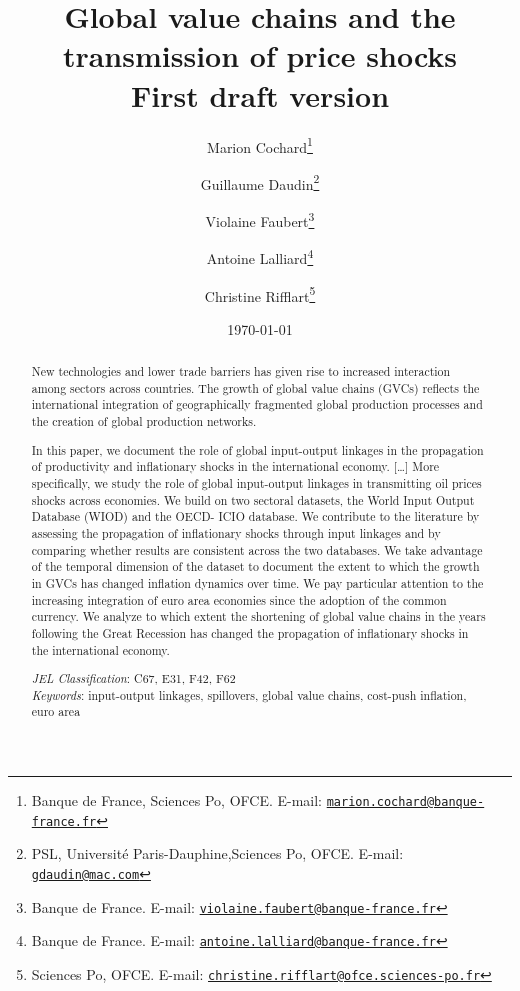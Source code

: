 \documentclass[11pt,a4paper]{article}
\newcommand{\email}[1]{\href{mailto:#1}{\nolinkurl{#1}}}
\begin{document}
\title{Global value chains and the transmission of price shocks\\
\vspace{1cm}
\normalsize{First draft version}
}
\vspace{1cm}

\date{\today}



\author{Marion Cochard\thanks{Banque de France, Sciences Po, OFCE. E-mail: \email{marion.cochard@banque-france.fr}}\and Guillaume Daudin\thanks{PSL, Université Paris-Dauphine,Sciences Po, OFCE. E-mail: \email{gdaudin@mac.com}}\and Violaine Faubert\thanks{Banque de France. E-mail: \email{violaine.faubert@banque-france.fr}} \and Antoine Lalliard\thanks{Banque de France. E-mail: \email{antoine.lalliard@banque-france.fr}} \and Christine Rifflart\thanks{Sciences Po, OFCE. E-mail: \email{christine.rifflart@ofce.sciences-po.fr}}
}



\maketitle

\begin{abstract}
{\small \noindent
New technologies and lower trade barriers has given rise to increased interaction among sectors across countries. The growth of global value chains (GVCs) reflects the international integration of geographically fragmented global production processes and the creation of global production networks.

In this paper, we document the role of global input-output linkages in the propagation of productivity and inflationary shocks in the international economy. 
[…] %
More specifically, we study the role of global input-output linkages in transmitting oil prices shocks across economies.
We build on two sectoral datasets, the World Input Output Database (WIOD) and the OECD- ICIO database. We contribute to the literature by assessing the propagation of inflationary shocks through input linkages and by comparing whether results are consistent across the two databases. We take advantage of the temporal dimension of the dataset to document the extent to which the growth in GVCs has changed inflation dynamics over time. We pay particular attention to the increasing integration of euro area economies since the adoption of the common currency. We analyze to which extent the shortening of global value chains in the years following the Great Recession has changed the propagation of inflationary shocks in the international economy. 

}

{\small \bigskip \noindent \emph{JEL Classification}\/: C67, E31, F42, F62\\}
{\small \noindent \emph{Keywords}\/: input-output linkages, spillovers, global value chains, cost-push inflation, euro area \\}
\end{abstract}
\end{document}
